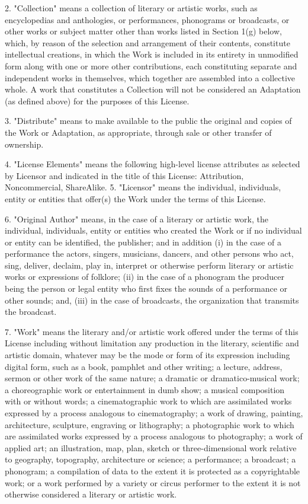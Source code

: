 2. "Collection" means a collection of literary or artistic works,
such as encyclopedias and anthologies, or performances, phonograms
or broadcasts, or other works or subject matter other than works
listed in Section 1(g) below, which, by reason of the selection and
arrangement of their contents, constitute intellectual creations,
in which the Work is included in its entirety in unmodified form
along with one or more other contributions, each constituting
separate and independent works in themselves, which together are
assembled into a collective whole. A work that constitutes a
Collection will not be considered an Adaptation (as defined above)
for the purposes of this License.

3. "Distribute" means to make available to the public the original
and copies of the Work or Adaptation, as appropriate, through sale
or other transfer of ownership.

4. "License Elements" means the following high-level license
attributes as selected by Licensor and indicated in the title of
this License: Attribution, Noncommercial, ShareAlike. 5. "Licensor"
means the individual, individuals, entity or entities that offer(s)
the Work under the terms of this License.

6. "Original Author" means, in the case of a literary or artistic
work, the individual, individuals, entity or entities who created
the Work or if no individual or entity can be identified, the
publisher; and in addition (i) in the case of a performance the
actors, singers, musicians, dancers, and other persons who act,
sing, deliver, declaim, play in, interpret or otherwise perform
literary or artistic works or expressions of folklore; (ii) in the
case of a phonogram the producer being the person or legal entity
who first fixes the sounds of a performance or other sounds; and,
(iii) in the case of broadcasts, the organization that transmits
the broadcast.

7. "Work" means the literary and/or artistic work offered under the
terms of this License including without limitation any production
in the literary, scientific and artistic domain, whatever may be
the mode or form of its expression including digital form, such as
a book, pamphlet and other writing; a lecture, address, sermon or
other work of the same nature; a dramatic or dramatico-musical
work; a choreographic work or entertainment in dumb show; a musical
composition with or without words; a cinematographic work to which
are assimilated works expressed by a process analogous to
cinematography; a work of drawing, painting, architecture,
sculpture, engraving or lithography; a photographic work to which
are assimilated works expressed by a process analogous to
photography; a work of applied art; an illustration, map, plan,
sketch or three-dimensional work relative to geography, topography,
architecture or science; a performance; a broadcast; a phonogram; a
compilation of data to the extent it is protected as a
copyrightable work; or a work performed by a variety or circus
performer to the extent it is not otherwise considered a literary
or artistic work.

